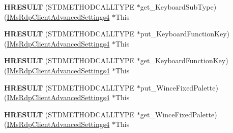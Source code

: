 \begin{DoxyCompactItemize}
\item 
\mbox{\label{struct_m_s_t_s_c_lib_1_1_i_ms_rdp_client_advanced_settings4_vtbl_afba5f8c7a74525d11df21eaf0be3cee3}} 
{\bfseries H\+R\+E\+S\+U\+LT} (S\+T\+D\+M\+E\+T\+H\+O\+D\+C\+A\+L\+L\+T\+Y\+PE $\ast$get\+\_\+\+Keyboard\+Sub\+Type)(\hyperlink{interface_m_s_t_s_c_lib_1_1_i_ms_rdp_client_advanced_settings4}{I\+Ms\+Rdp\+Client\+Advanced\+Settings4} $\ast$This
\item 
\mbox{\label{struct_m_s_t_s_c_lib_1_1_i_ms_rdp_client_advanced_settings4_vtbl_aeaa696571c2635aff7010aa0cad6f3f8}} 
{\bfseries H\+R\+E\+S\+U\+LT} (S\+T\+D\+M\+E\+T\+H\+O\+D\+C\+A\+L\+L\+T\+Y\+PE $\ast$put\+\_\+\+Keyboard\+Function\+Key)(\hyperlink{interface_m_s_t_s_c_lib_1_1_i_ms_rdp_client_advanced_settings4}{I\+Ms\+Rdp\+Client\+Advanced\+Settings4} $\ast$This
\item 
\mbox{\label{struct_m_s_t_s_c_lib_1_1_i_ms_rdp_client_advanced_settings4_vtbl_a80d737f967dd7ab0cd16c7950b002834}} 
{\bfseries H\+R\+E\+S\+U\+LT} (S\+T\+D\+M\+E\+T\+H\+O\+D\+C\+A\+L\+L\+T\+Y\+PE $\ast$get\+\_\+\+Keyboard\+Function\+Key)(\hyperlink{interface_m_s_t_s_c_lib_1_1_i_ms_rdp_client_advanced_settings4}{I\+Ms\+Rdp\+Client\+Advanced\+Settings4} $\ast$This
\item 
\mbox{\label{struct_m_s_t_s_c_lib_1_1_i_ms_rdp_client_advanced_settings4_vtbl_ab970776af9e1ebed47a952df42970619}} 
{\bfseries H\+R\+E\+S\+U\+LT} (S\+T\+D\+M\+E\+T\+H\+O\+D\+C\+A\+L\+L\+T\+Y\+PE $\ast$put\+\_\+\+Wince\+Fixed\+Palette)(\hyperlink{interface_m_s_t_s_c_lib_1_1_i_ms_rdp_client_advanced_settings4}{I\+Ms\+Rdp\+Client\+Advanced\+Settings4} $\ast$This
\item 
\mbox{\label{struct_m_s_t_s_c_lib_1_1_i_ms_rdp_client_advanced_settings4_vtbl_ac14cd7892ab40c8132be26e5fe33182a}} 
{\bfseries H\+R\+E\+S\+U\+LT} (S\+T\+D\+M\+E\+T\+H\+O\+D\+C\+A\+L\+L\+T\+Y\+PE $\ast$get\+\_\+\+Wince\+Fixed\+Palette)(\hyperlink{interface_m_s_t_s_c_lib_1_1_i_ms_rdp_client_advanced_settings4}{I\+Ms\+Rdp\+Client\+Advanced\+Settings4} $\ast$This

\end{DoxyCompactItemize}
